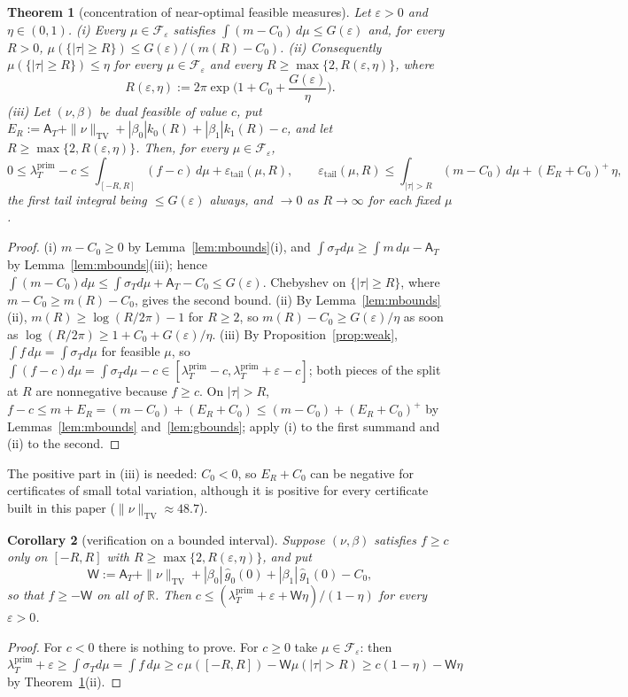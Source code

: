 \documentclass[11pt]{amsart}
\newtheorem{theorem}{Theorem}[section]
\newtheorem{corollary}[theorem]{Corollary}
\theoremstyle{definition}
\theoremstyle{remark}
\newcommand{\R}{\mathbb R}
\newcommand{\TV}{\operatorname{TV}}
\newcommand{\lamP}{\lambda^{\mathrm{prim}}_T}
\newcommand{\sT}{\sigma_T}
\newcommand{\gh}[1]{\widehat g_{#1}}
\newcommand{\Aconst}{\mathsf A_T}
\begin{document}
\begin{theorem}[concentration of near-optimal feasible measures]\label{thm:P3}
Let $\varepsilon>0$ and $\eta\in(0,1)$.
\emph{(i)} Every $\mu\in\mathcal F_\varepsilon$ satisfies $\int(m-C_0)\,d\mu\le G(\varepsilon)$ and,
for every $R>0$, $\mu(\{|\tau|\ge R\})\le G(\varepsilon)/(m(R)-C_0)$.
\emph{(ii)} Consequently $\mu(\{|\tau|\ge R\})\le\eta$ for every $\mu\in\mathcal F_\varepsilon$ and
every $R\ge\max\{2,R(\varepsilon,\eta)\}$, where
\[
R(\varepsilon,\eta):=2\pi\exp\Big(1+C_0+\frac{G(\varepsilon)}\eta\Big).
\]
\emph{(iii)} Let $(\nu,\beta)$ be dual feasible of value $c$, put
$E_R:=\Aconst+\|\nu\|_{\TV}+|\beta_0|k_0(R)+|\beta_1|k_1(R)-c$, and let
$R\ge\max\{2,R(\varepsilon,\eta)\}$. Then, for every $\mu\in\mathcal F_\varepsilon$,
\[
0\le\lamP-c\le\int_{[-R,R]}(f-c)\,d\mu+\varepsilon_{\mathrm{tail}}(\mu,R),\qquad
\varepsilon_{\mathrm{tail}}(\mu,R)\le\int_{|\tau|>R}(m-C_0)\,d\mu+(E_R+C_0)^+\,\eta ,
\]
the first tail integral being $\le G(\varepsilon)$ always, and $\to0$ as $R\to\infty$ for each fixed
$\mu$.
\end{theorem}
\begin{proof}
(i) $m-C_0\ge0$ by Lemma~\ref{lem:mbounds}(i), and $\int\sT d\mu\ge\int m\,d\mu-\Aconst$ by
Lemma~\ref{lem:mbounds}(iii); hence $\int(m-C_0)d\mu\le\int\sT d\mu+\Aconst-C_0\le G(\varepsilon)$.
Chebyshev on $\{|\tau|\ge R\}$, where $m-C_0\ge m(R)-C_0$, gives the second bound. (ii) By
Lemma~\ref{lem:mbounds}(ii), $m(R)\ge\log(R/2\pi)-1$ for $R\ge2$, so $m(R)-C_0\ge G(\varepsilon)/\eta$
as soon as $\log(R/2\pi)\ge1+C_0+G(\varepsilon)/\eta$. (iii) By Proposition~\ref{prop:weak},
$\int f\,d\mu=\int\sT d\mu$ for feasible $\mu$, so $\int(f-c)d\mu=\int\sT d\mu-c\in[\lamP-c,\lamP+\varepsilon-c]$;
both pieces of the split at $R$ are nonnegative because $f\ge c$. On $|\tau|>R$,
$f-c\le m+E_R=(m-C_0)+(E_R+C_0)\le(m-C_0)+(E_R+C_0)^+$ by Lemmas~\ref{lem:mbounds}
and~\ref{lem:gbounds}; apply (i) to the first summand and (ii) to the second.
\end{proof}

The positive part in (iii) is needed: $C_0<0$, so $E_R+C_0$ can be negative for certificates of
small total variation, although it is positive for every certificate built in this paper
($\|\nu\|_{\TV}\approx48.7$).

\begin{corollary}[verification on a bounded interval]\label{cor:AP}
Suppose $(\nu,\beta)$ satisfies $f\ge c$ \emph{only} on $[-R,R]$ with
$R\ge\max\{2,R(\varepsilon,\eta)\}$, and put
\[
\mathsf W:=\Aconst+\|\nu\|_{\TV}+|\beta_0|\,\gh0(0)+|\beta_1|\,\gh1(0)-C_0 ,
\]
so that $f\ge-\mathsf W$ on all of $\R$. Then $c\le(\lamP+\varepsilon+\mathsf W\eta)/(1-\eta)$ for
every $\varepsilon>0$.
\end{corollary}
\begin{proof}
For $c<0$ there is nothing to prove. For $c\ge0$ take $\mu\in\mathcal F_\varepsilon$: then
$\lamP+\varepsilon\ge\int\sT d\mu=\int f\,d\mu\ge c\,\mu([-R,R])-\mathsf W\mu(|\tau|>R)\ge c(1-\eta)-\mathsf W\eta$
by Theorem~\ref{thm:P3}(ii).
\end{proof}
\end{document}
